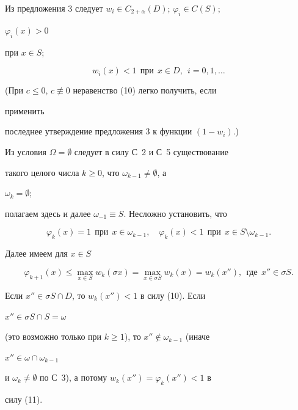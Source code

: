 Из предложения 3 следует $w_i\in C_{2+\alpha}(D)$; $\varphi_i\in C(S)$; 


$\varphi_i(x)>0$ 


при $x\in S$; 


\begin{equation} 


w_i(x)<1\ \ \text{при} \ \ x\in D,\ \ i=0,1,\dotsc 


\end{equation} 


(При $c\le0$, $c\not\equiv0$ неравенство (10) легко получить, если 


применить 


последнее утверждение предложения 3 к функции $(1-w_i)$.) 


 


Из условия $\Omega=\emptyset$ следует в силу С~2 и С~5 существование 


такого целого числа $k\ge0$, что $\omega_{k-1}\ne\emptyset$, а 


$\omega_k=\emptyset$; 


полагаем здесь и далее $\omega_{-1}\equiv S$. Несложно установить, что 


\begin{equation} 


\varphi_k(x)=1\ \ \text{при}\ \ x\in \omega_{k-1},\quad 


\varphi_k(x)<1\ \ \text{при}\ \ x\in S\setminus\omega_{k-1}. 


\end{equation} 


Далее имеем для $x\in S$ 


$$ 


\varphi_{k+1}(x)\le\max_{x\in S}w_k(\sigma x)= 


\max_{x\in\sigma S}w_k(x)=w_k(x''),\ \ 


\text{где}\ \ x''\in\sigma S. 


$$ 


Если $x''\in\sigma S\cap D$, то $w_k(x'')<1$ в силу (10). Если 


$x''\in\sigma S\cap S=\omega$ 


(это возможно только при $k\ge1$), то $x''\notin\omega_{k-1}$ (иначе 


$x''\in\omega\cap\omega_{k-1}$ 


и $\omega_k\ne\emptyset$ по С~3), а потому $w_k(x'')=\varphi_k(x'')<1$ в 


силу (11). 


